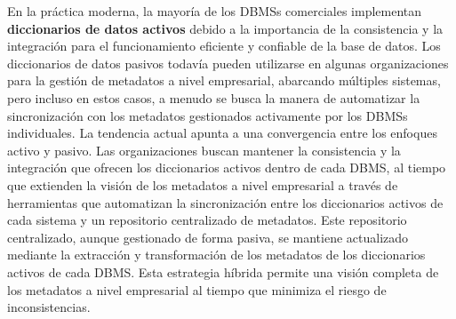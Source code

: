 En la práctica moderna, la mayoría de los DBMSs comerciales implementan \textbf{diccionarios de datos activos} debido a la importancia de la consistencia y la integración para el funcionamiento eficiente y confiable de la base de datos. Los diccionarios de datos pasivos todavía pueden utilizarse en algunas organizaciones para la gestión de metadatos a nivel empresarial, abarcando múltiples sistemas, pero incluso en estos casos, a menudo se busca la manera de automatizar la sincronización con los metadatos gestionados activamente por los DBMSs individuales. La tendencia actual apunta a una convergencia entre los enfoques activo y pasivo.  Las organizaciones buscan mantener la consistencia y la integración que ofrecen los diccionarios activos dentro de cada DBMS, al tiempo que extienden la visión de los metadatos a nivel empresarial a través de herramientas que automatizan la sincronización entre los diccionarios activos de cada sistema y un repositorio centralizado de metadatos.  Este repositorio centralizado, aunque gestionado de forma pasiva, se mantiene actualizado mediante la extracción y transformación de los metadatos de los diccionarios activos de cada DBMS.  Esta estrategia híbrida permite una visión completa de los metadatos a nivel empresarial al tiempo que minimiza el riesgo de inconsistencias.

